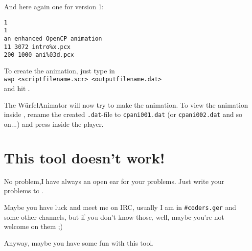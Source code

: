 And here again one for version 1: 
\begin{verbatim} 
1 
1 
an enhanced OpenCP animation 
11 3072 intro%x.pcx 
200 1000 ani%03d.pcx 
\end{verbatim} 

To create the animation, just type in \\
\texttt{wap <scriptfilename.scr> <outputfilename.dat>} \\
and hit . 
 
The W\"urfelAnimator will now try to make the animation. 
To view the animation inside \cp, rename the created \texttt{.dat}-file
to \texttt{cpani001.dat} (or \texttt{cpani002.dat} and so on...) and press
 inside the player. 
 
\section{This tool doesn't work!}
No problem,I have always an open ear for your problems. Just write your
problems to \textbf{}.

Maybe you have luck and meet me on IRC, usually I am in \texttt{\#coders.ger}
and some other channels, but if you don't know those, well, maybe you're
not welcome on them ;) 
 
Anyway, maybe you have some fun with this tool.
